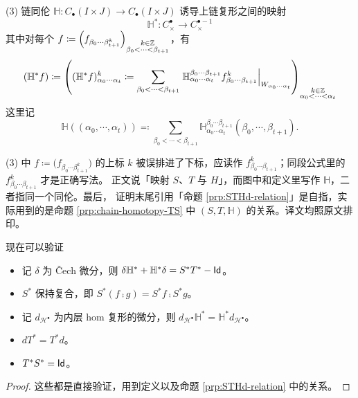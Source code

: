 \begin{dfn}
\noindent
(3) 链同伦
$
\mathbb{H}:
C_{\bullet}(I\times J)
\rightarrow
C_{\bullet}(I\times J)
$
诱导上链复形之间的映射
$$
\mathbb{H}^{\ast}\colon C_{\times}^{\bullet}\to C_{\times}^{\bullet -1}
$$其中对每个 $f\coloneqq\left(f_{\beta_0\dotsb\beta_{t+1}^k}\right)_
{
    \begin{subarray}{c}
        k\in\mathbb{Z}\\ 
        \beta_0<\dotsb<\beta_{t+1}
    \end{subarray}
    }$，有$$
(\mathbb{H}^{\ast} f)\coloneqq\left((\mathbb{H}^{\ast} f)^k_{\alpha_0\dotsb\alpha_t}\coloneqq\sum_{\beta_0<\dotsb<\beta_{t+1}}\left. \mathbb{H}_{\alpha_0\dotsb\alpha_t}^{\beta_0\dotsb\beta_{t+1}} f_{\beta_0\dotsb\beta_{t+1}}^k\right|_{W_{\alpha_0\dotsb\alpha_t}}\right)
_{
    \begin{subarray}{c}
        k\in\mathbb{Z}\\ 
        \alpha_0<\dotsb<\alpha_t
    \end{subarray}
}
$$这里记 \[
    \mathbb{H}((\alpha_0,\dotsb,\alpha_t))\eqqcolon\sum_{\beta_0<\dotsb<\beta_{t+1}}\mathbb{H}_{\alpha_0\dotsb\alpha_t}^{\beta_0\dotsb\beta_{t+1}} (\beta_0,\dotsb ,\beta_{t+1}).
\]
\end{dfn}

\begin{yizhu}[原文 (3) 与证明里的几处笔误]
(3) 中 $f\coloneqq\big(f_{\beta_0\dotsb\beta_{t+1}^k}\big)$ 的上标 $k$ 被误排进了下标，应读作
$f_{\beta_0\dotsb\beta_{t+1}}^{k}$；同段公式里的 $f_{\beta_0\dotsb\beta_{t+1}}^k$ 才是正确写法。
正文说「映射 $S$、$T$ 与 $H$」，而图中和定义里写作 $\mathbb{H}$，二者指同一个同伦。最后，
证明末尾引用「命题 \ref{prp:STHd-relation}」是自指，实际用到的是命题
\ref{prp:chain-homotopy-TS} 中 $(S,T,\mathbb{H})$ 的关系。译文均照原文排印。
\end{yizhu}

现在可以验证
\begin{prp}\label{prp:STHd-relation}
    \begin{itemize}
        \item 记 $\delta$ 为 \v{C}ech 微分，则 $\delta\mathbb{H}^{\ast} +\mathbb{H}^{\ast} \delta=S^{\ast} T^{\ast} -\operatorname{\mathsf{Id}}$。
        \item $S^{\ast}$ 保持复合，即 $S^{\ast} (f\comp g)=S^{\ast} f\comp S^{\ast} g$。
        \item 记 $d_{\mathcal{H}^{\bullet}}$ 为内层 hom 复形的微分，则 $d_{\mathcal{H}^{\bullet}}\mathbb{H}^{\ast} =\mathbb{H}^{\ast}d_{\mathcal{H}^{\bullet}}$。
        \item $dT^{\ast} =T^{\ast} d$。
        \item $T^{\ast} S^{\ast} =\operatorname{\mathsf{Id}}$。
    \end{itemize}
\end{prp}
\begin{proof}
    这些都是直接验证，用到定义以及命题 \ref{prp:STHd-relation} 中的关系。
\end{proof}

